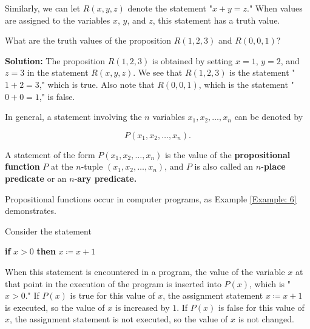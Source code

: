 \documentclass{Axon}
\begin{document}
Similarly, we can let \(R(x, y, z)\) denote the statement "\(x + y = z\)." When values are assigned to the variables \(x\), \(y\), and \(z\), this statement has a truth value.

\begin{example}
    What are the truth values of the proposition \(R(1, 2, 3)\) and \(R(0, 0, 1)\)?

    \noindent
    \textbf{Solution:}
    The proposition \(R(1, 2, 3)\) is obtained by setting \(x = 1\), \(y = 2\), and \(z = 3\) in the statement \(R(x, y, z)\). We see that \(R(1, 2, 3)\) is the statement "\(1 + 2 = 3\)," which is true. Also note that \(R(0, 0, 1)\), which is the statement "\(0 + 0 = 1\)," is false.
\end{example}

In general, a statement involving the \(n\) variables \(x_1, x_2, \ldots, x_n\) can be denoted by

\begin{equation}
    P(x_1, x_2, \ldots, x_n).
\end{equation}

A statement of the form \(P(x_1, x_2, \ldots, x_n)\) is the value of the \textbf{propositional function} \(P\) at the \(n\)-tuple \((x_1, x_2, \ldots, x_n)\), and \(P\) is also called an \(n\)-\textbf{place predicate} or an \(n\)-\textbf{ary predicate.}

Propositional functions occur in computer programs, as Example \ref{Example: 6} demonstrates.

\begin{example}\label{Example: 16}
    Consider the statement
    
    \begin{center}
        \textbf{if} \(x > 0\) \textbf{then} \(x \coloneq x + 1\)
    \end{center}

    When this statement is encountered in a program, the value of the variable \(x\) at that point in the execution of the program is inserted into \(P(x)\), which is "\(x > 0\)." If \(P(x)\) is true for this value of \(x\), the assignment statement \(x \coloneq x + 1\) is executed, so the value of \(x\) is increased by \(1\). If \(P(x)\) is false for this value of \(x\), the assignment statement is not executed, so the value of \(x\) is not changed.        
\end{example}
\end{document}
